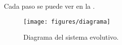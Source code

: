 \documentclass[10pt,twocolumn,a4paper]{articuloAPA}
\begin{document}
Cada paso se puede ver en la .

\begin{figure}
  \centering
  \texttt{[image: figures/diagrama]}
  \decoRule
  \caption[Diagrama del sistema evolutivo. ]{Diagrama del sistema evolutivo.}
  \label{fig:diagrama}
\end{figure}

  \printbibliography
\end{document}

